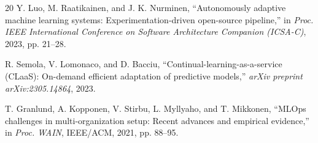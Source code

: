 \begin{thebibliography}{20}
Y. Luo, M. Raatikainen, and J. K. Nurminen,
``Autonomously adaptive machine learning systems: Experimentation-driven open-source pipeline,''
in \emph{Proc. IEEE International Conference on Software Architecture Companion (ICSA-C)}, 2023, pp. 21--28.

R. Semola, V. Lomonaco, and D. Bacciu,
``Continual-learning-as-a-service (CLaaS): On-demand efficient adaptation of predictive models,''
\emph{arXiv preprint arXiv:2305.14864}, 2023.

T. Granlund, A. Kopponen, V. Stirbu, L. Myllyaho, and T. Mikkonen,
``MLOps challenges in multi-organization setup: Recent advances and empirical evidence,''
in \emph{Proc. WAIN}, IEEE/ACM, 2021, pp. 88--95.
\end{thebibliography}
